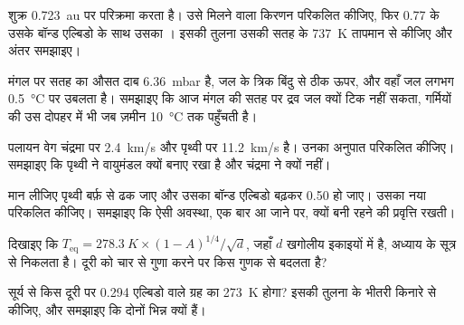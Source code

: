 \begin{exercise}[$\star\star$]\label{exo:g10:habitable-planet:8}
शुक्र \qty{0.723}{au} पर परिक्रमा करता है। उसे मिलने वाला किरणन परिकलित कीजिए, फिर
0.77 के उसके बॉन्ड एल्बिडो के साथ उसका । इसकी तुलना उसकी सतह के
\qty{737}{K} तापमान से कीजिए और अंतर समझाइए।
\end{exercise}

\begin{exercise}[$\star\star$]\label{exo:g10:habitable-planet:9}
मंगल पर सतह का औसत दाब \qty{6.36}{mbar} है, जल के त्रिक बिंदु से ठीक ऊपर, और वहाँ
जल लगभग \qty{0.5}{\degreeCelsius} पर उबलता है।
समझाइए कि आज मंगल की सतह पर द्रव जल क्यों टिक नहीं सकता, गर्मियों की उस दोपहर में भी
जब ज़मीन \qty{10}{\degreeCelsius} तक पहुँचती है।
\end{exercise}

\begin{exercise}[$\star\star$]\label{exo:g10:habitable-planet:10}
पलायन वेग चंद्रमा पर \qty{2.4}{km/s} और पृथ्वी पर \qty{11.2}{km/s} है।
उनका अनुपात परिकलित कीजिए। समझाइए कि पृथ्वी ने वायुमंडल क्यों बनाए रखा है और
चंद्रमा ने क्यों नहीं।
\end{exercise}

\begin{exercise}[$\star\star$]\label{exo:g10:habitable-planet:11}
मान लीजिए पृथ्वी बर्फ़ से ढक जाए और उसका बॉन्ड एल्बिडो बढ़कर 0.50 हो जाए। उसका नया
 परिकलित कीजिए। समझाइए कि ऐसी अवस्था, एक बार आ जाने पर, क्यों बनी
रहने की प्रवृत्ति रखती।
\end{exercise}

\begin{exercise}[$\star\star\star$]\label{exo:g10:habitable-planet:12}
दिखाइए कि $T_{\mathrm{eq}} = \qty{278.3}{K} \times (1-A)^{1/4}/\sqrt{d}$, जहाँ
$d$ खगोलीय इकाइयों में है, अध्याय के सूत्र से निकलता है। दूरी को चार से गुणा करने पर  किस गुणक से बदलता है?
\end{exercise}

\begin{exercise}[$\star\star\star$]\label{exo:g10:habitable-planet:13}
सूर्य से किस दूरी पर 0.294 एल्बिडो वाले ग्रह का  \qty{273}{K} होगा?
इसकी तुलना  के भीतरी किनारे से कीजिए, और समझाइए कि दोनों भिन्न क्यों
हैं।
\end{exercise}

